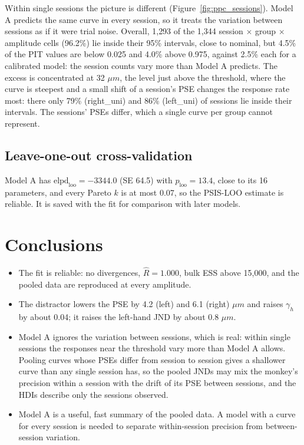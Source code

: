 \documentclass[11pt]{article}
\begin{document}
Within single sessions the picture is different (Figure~\ref{fig:ppc_sessions}).
Model A predicts the same curve in every session, so it treats the variation
between sessions as if it were trial noise. Overall, 1{,}293 of the 1{,}344
session $\times$ group $\times$ amplitude cells (96.2\%) lie inside their 95\%
intervals, close to nominal, but 4.5\% of the PIT values are below 0.025 and
4.0\% above 0.975, against 2.5\% each for a calibrated model: the session counts
vary more than Model A predicts. The excess is concentrated at 32 $\mu m$, the
level just above the threshold, where the curve is steepest and a small shift
of a session's PSE changes the response rate most: there only 79\% (right\_uni)
and 86\% (left\_uni) of sessions lie inside their intervals. The sessions' PSEs
differ, which a single curve per group cannot represent.

\subsection{Leave-one-out cross-validation}

Model A has $\text{elpd}_\text{loo} = -3344.0$ (SE 64.5) with
$p_\text{loo} = 13.4$, close to its 16 parameters, and every Pareto $k$ is at most
0.07, so the PSIS-LOO estimate is reliable. It is saved with the fit for comparison
with later models.

\section{Conclusions}

\begin{itemize}
  \item The fit is reliable: no divergences, $\hat{R} = 1.000$, bulk ESS above
        15{,}000, and the pooled data are reproduced at every amplitude.
  \item The distractor lowers the PSE by 4.2 (left) and 6.1 (right) $\mu m$ and
        raises $\gamma_h$ by about 0.04; it raises the left-hand JND by about
        0.8 $\mu m$.
  \item Model A ignores the variation between sessions, which is real: within
        single sessions the responses near the threshold vary more than Model A
        allows. Pooling curves whose PSEs differ from session to session gives a
        shallower curve than any single session has, so the pooled JNDs may mix
        the monkey's precision within a session with the drift of its PSE between
        sessions, and the HDIs describe only the sessions observed.
  \item Model A is a useful, fast summary of the pooled data. A model with a
        curve for every session is needed to separate within-session precision
        from between-session variation.
\end{itemize}
\end{document}

